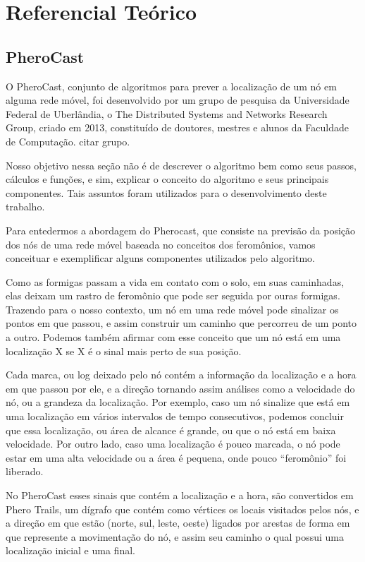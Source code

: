 \documentclass[12pt, %
openright, 
oneside,
a4paper,
brazil]{facom-ufu-abntex2}
\begin{document}
\chapter{Referencial Teórico}
\section{PheroCast}

	O PheroCast, conjunto de algoritmos para prever a localização de um nó em alguma rede móvel, foi desenvolvido por um grupo de pesquisa da Universidade Federal de Uberlândia, o The Distributed Systems and Networks  Research Group, criado em 2013, constituído de doutores, mestres e alunos da Faculdade de Computação. citar grupo. 
	
	Nosso objetivo nessa seção não é de descrever o algoritmo bem como seus passos, cálculos e funções, e sim, explicar o conceito do algoritmo e seus principais componentes. Tais assuntos foram utilizados para o desenvolvimento deste trabalho.
	
	Para entedermos a abordagem do Pherocast, que consiste na previsão da posição dos nós de uma rede móvel baseada no conceitos dos feromônios, vamos conceituar e exemplificar alguns componentes utilizados pelo algoritmo.

	Como as formigas passam a vida em contato com o solo, em suas caminhadas, elas deixam um rastro de feromônio que pode ser seguida por ouras formigas. Trazendo para o nosso contexto, um nó em uma rede móvel pode sinalizar os pontos em que passou, e assim construir um caminho que percorreu de um ponto a outro. Podemos também afirmar com esse conceito que um nó está em uma localização X se X é o sinal mais perto de sua posição.
	
	\cite{6838650} Cada marca, ou log deixado pelo nó contém a informação da localização e a hora em que passou por ele, e a direção  tornando assim análises como a velocidade do nó, ou a grandeza da localização. Por exemplo, caso um nó sinalize que está em uma localização em vários intervalos de tempo consecutivos, podemos concluir que essa localização, ou área de alcance é grande, ou que o nó está em baixa velocidade. Por outro lado, caso uma localização é pouco marcada, o nó pode estar em uma alta velocidade ou a área é pequena, onde pouco ``feromônio'' foi liberado.
	
	No PheroCast esses sinais que contém a localização e a hora, são convertidos em Phero Trails, um dígrafo que contém como vértices os locais visitados pelos nós, e a direção em que estão (norte, sul, leste, oeste) ligados  por arestas de forma em que represente a movimentação do nó, e assim seu caminho o qual possui uma localização inicial e uma final.
	
\end{document}
